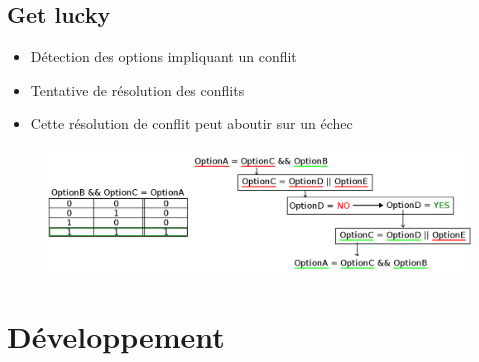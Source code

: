 \documentclass[11pt]{beamer}
\begin{document}
\subsection{Get lucky}
\begin{frame}
    \begin{itemize}
        \setlength{\itemsep}{20pt}
        \item Détection des options impliquant un conflit
        \item Tentative de résolution des conflits
        \item Cette résolution de conflit peut aboutir sur un échec
    \end{itemize}
\end{frame}

\begin{frame}
    \begin{figure}
        \includegraphics[scale=0.28]{img_diapo_2.png}
        \centering
    \end{figure}
\end{frame}

\section{Développement}
\end{document}
